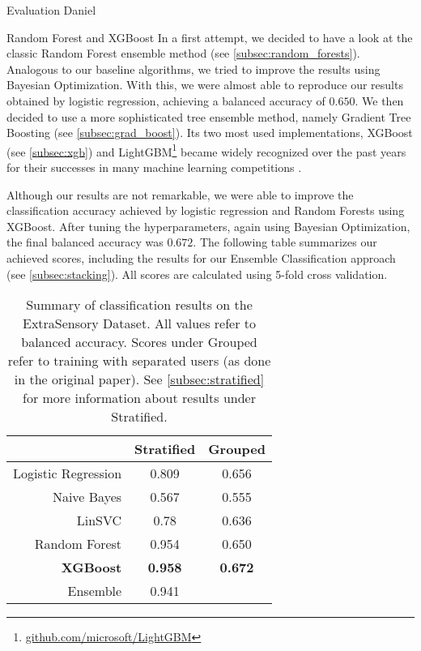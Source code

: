 \begin{section}{Evaluation Daniel}
	\begin{subsection}{Random Forest and XGBoost}
		In a first attempt, we decided to have a look at the classic Random Forest ensemble method (see \ref{subsec:random_forests}). Analogous to our baseline algorithms, we tried to improve the results using Bayesian Optimization. With this, we were almost able to reproduce our results obtained by logistic regression, achieving a balanced accuracy of $0.650$. We then decided to use a more sophisticated tree ensemble method, namely Gradient Tree Boosting (see \ref{subsec:grad_boost}). Its two most used implementations, XGBoost (see \ref{subsec:xgb}) and LightGBM\footnote{\href{https://github.com/microsoft/LightGBM}{github.com/microsoft/LightGBM}} became widely recognized over the past years for their successes in many machine learning competitions \cite{Chen16}. \par
		Although our results are not remarkable, we were able to improve the classification accuracy achieved by logistic regression and Random Forests using XGBoost. After tuning the hyperparameters, again using Bayesian Optimization, the final balanced accuracy was $0.672$.  The following table summarizes our achieved scores, including the results for our Ensemble Classification approach (see \ref{subsec:stacking}). All scores are calculated using 5-fold cross validation.
		\begin{table}[H]
			\begin{center} 
				\begin{tabular}{r|c|c}
					\toprule
					& Stratified & Grouped \\
					\midrule
					Logistic Regression & 0.809 & 0.656 \\
					Naive Bayes & 0.567 & 0.555 \\
					LinSVC & 0.78 & 0.636 \\
					Random Forest & 0.954 & 0.650 \\
					\textbf{XGBoost} & \textbf{0.958} & \textbf{0.672} \\
					\midrule
					Ensemble & 0.941 & \\
					\bottomrule
				\end{tabular}
			\end{center}
			\caption{Summary of classification results on the ExtraSensory Dataset. All values refer to balanced accuracy. Scores under \glqq Grouped\grqq{} refer to training with separated users (as done in the original paper). See \ref{subsec:stratified} for more information about results under \glqq Stratified\grqq.}
		\end{table}
	\end{subsection}


\end{section}
